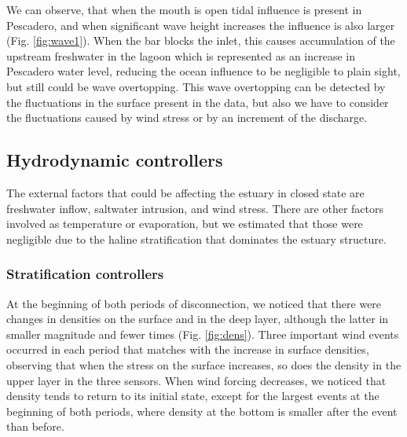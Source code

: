 \documentclass[tesis.tex]{subfiles}
\begin{document}
We can observe, that when the mouth is open tidal influence is present in Pescadero, and when significant wave height increases the influence is also larger (Fig. \ref{fig:wave1}). When the bar blocks the inlet, this causes accumulation of the upstream freshwater in the lagoon which is represented as an increase in Pescadero water level, reducing the ocean influence to be negligible to plain sight, but still could be wave overtopping. This wave overtopping can be detected by the fluctuations in the surface present in the data, but also we have to consider the fluctuations caused by wind stress or by an increment of the discharge.\\

\subsection{Hydrodynamic controllers}

The external factors that could be affecting the estuary in closed state are freshwater inflow, saltwater intrusion, and wind stress. There are other factors involved as temperature or evaporation, but we estimated that those were negligible due to the haline stratification that dominates the estuary structure.\\

\subsubsection{Stratification controllers}

At the beginning of both periods of disconnection, we noticed that there were changes in densities on the surface and in the deep layer, although the latter in smaller magnitude and fewer times (Fig. \ref{fig:dens}). Three important wind events occurred in each period that matches with the increase in surface densities, observing that when the stress on the surface increases, so does the density in the upper layer in the three sensors. When wind forcing decreases, we noticed that density tends to return to its initial state, except for the largest events at the beginning of both periods, where density at the bottom is smaller after the event than before.\\
\end{document}
